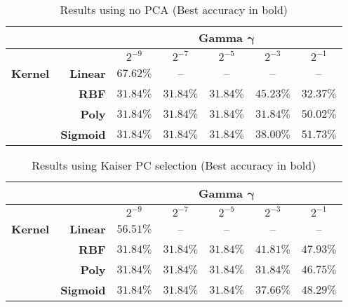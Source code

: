 \documentclass[12pt,a4paper,titlepage,twoside]{report}
\begin{document}
	\begin{table}[h]
		\centering
		\begin{tabular}{|ll|ccccc|}
			\hline
                                      &                                      &   			& \multicolumn{3}{c}{\textbf{Gamma $\boldsymbol{\gamma}$}} &   \\ \hline
                                      &                                      				& $2^{-9}$  		& $2^{-7}$       	& $2^{-5}$      	& $2^{-3}$			& $2^{-1}$ \\ \hline
			\multicolumn{1}{|l|}{\textbf{Kernel}} & \multicolumn{1}{r|}{\textbf{Linear}} 	& \boldmath$67.62\%$ 	& --  	& --				& --	  			& --			   \\
			\multicolumn{1}{|l|}{\textbf{}}       & \multicolumn{1}{r|}{\textbf{RBF}}    	& $31.84\%$ 	& $31.84\%$  & $31.84\%$  & $45.23\%$  & $32.37\%$ \\
			\multicolumn{1}{|l|}{\textbf{}}       & \multicolumn{1}{r|}{\textbf{Poly}}   	& $31.84\%$ 	& $31.84\%$  & $31.84\%$  & $31.84\%$  & $50.02\%$ \\
			\multicolumn{1}{|l|}{\textbf{}}       & \textbf{Sigmoid}                     	& $31.84\%$ 	& $31.84\%$  & $31.84\%$  & $38.00\%$  & $51.73\%$ \\ \hline
		\end{tabular}%
		\caption {Results using no PCA (Best accuracy in bold)} 
		\label{tab:no-pca-tab} 
	\end{table}
	
	\begin{table}[h]
		\centering
		\begin{tabular}{|ll|ccccc|}
			\hline
                                      &                                      &   			& \multicolumn{3}{c}{\textbf{Gamma $\boldsymbol{\gamma}$}} &   \\ \hline
                                      &                                      				& $2^{-9}$  		& $2^{-7}$       	& $2^{-5}$      	& $2^{-3}$			& $2^{-1}$ \\ \hline
			\multicolumn{1}{|l|}{\textbf{Kernel}} & \multicolumn{1}{r|}{\textbf{Linear}} 	& \boldmath$56.51\%$ 	& --  	& --				& --	  			& --			   \\
			\multicolumn{1}{|l|}{\textbf{}}       & \multicolumn{1}{r|}{\textbf{RBF}}    	& $31.84\%$ 	& $31.84\%$  & $31.84\%$  & $41.81\%$  & $47.93\%$ \\
			\multicolumn{1}{|l|}{\textbf{}}       & \multicolumn{1}{r|}{\textbf{Poly}}   	& $31.84\%$ 	& $31.84\%$  & $31.84\%$  & $31.84\%$  & $46.75\%$ \\
			\multicolumn{1}{|l|}{\textbf{}}       & \textbf{Sigmoid}                     	& $31.84\%$ 	& $31.84\%$  & $31.84\%$  & $37.66\%$  & $48.29\%$ \\ \hline
		\end{tabular}%
		\caption {Results using Kaiser PC selection (Best accuracy in bold)} 
		\label{tab:kasier-pca-tab}
	\end{table}
	
\end{document}
